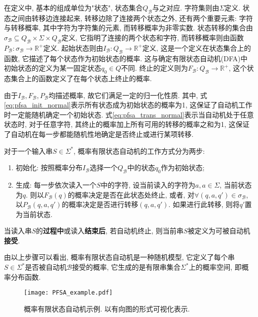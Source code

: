         在定义中, 基本的组成单位为"状态", 状态集合$Q_{\mathcal{B}}$与之对应. 字符集则由$\Sigma$定义. 状态之间由转移边连接起来, 转移边除了连接两个状态之外, 还有两个重要元素: 字符与转移概率, 其中字符为字符集的元素, 而转移概率为非零实数. 状态转移的集合由$\sigma_{\mathcal{B}} \subseteq Q_{\mathcal{B}} \times \Sigma \times Q_{\mathcal{B}}$定义, 它指明了连接的两个状态和字符, 而转移概率则由函数$P_{\mathcal{B}} : \sigma_{\mathcal{B}} \to \mathbb{R}^{+}$定义. 起始状态则由$I_{\mathcal{B}} : Q_{\mathcal{B}} \to \mathbb{R}^{+}$定义, 这是一个定义在状态集合上的函数, 它描述了每个状态作为初始状态的概率. 这与确定有限状态自动机(DFA)中初始状态的定义为某一固定状态$q_0 \in Q$不同. 终止的定义则为$F_{\mathcal{B}}: Q_{\mathcal{B}} \to \mathbb{R}^{+}$, 这个状态集合上的函数定义了在每个状态上终止的概率.
        
        由于$I_\mathcal{B}, F_\mathcal{B}, P_\mathcal{B}$均描述概率, 故它们满足一定的归一化性质. 其中, 式\ref{eq:pfsa_init_normal}表示所有状态成为初始状态的概率为1, 这保证了自动机工作时一定能随机确定一个初始状态. 式\ref{eq:pfsa_trans_normal}表示当自动机处于任意状态时, 对于任意字符, 其终止的概率加上所有可用的转移的概率之和为1, 这保证了自动机在每一步都能随机性地确定是否终止或进行某项转移.
        
        对于一个输入串$S \in \Sigma^{*}$, 概率有限状态自动机的工作方式分为两步:
        \begin{enumerate}
            \item 初始化: 按照概率分布$I_\mathcal{B}$选择一个$Q_{\mathcal{B}}$中的状态$q_0$作为初始状态;
            
            \item 生成: 每一步依次读入一个$S$中的字符, 设当前读入的字符为$a, a \in \Sigma$, 当前状态为$q$. 则以$F_{\mathcal{B}}(q)$的概率决定是否在此状态处终止, 或者, 对$\forall (q, a, q') \in \sigma_{\mathcal{B}}$, 以$P_{\mathcal{B}}(q, a, q')$的概率决定是否进行转移$(q,a,q')$. 如果进行此转移, 则将$q'$置为当前状态.
        \end{enumerate}
        当读入串$S$的\textbf{过程中}或读入\textbf{结束后}, 若自动机终止, 则当前串$S$被定义为可被自动机\textbf{接受}.
        
        由以上步骤可以看出, 概率有限状态自动机是一种随机模型, 它定义了每个串$S \in \Sigma^{*}$是否被自动机$\mathcal{B}$接受的概率, 它生成的是有限串集合$\Sigma^{*}$上的概率空间, 即概率分布函数.
        
        \begin{figure}[!htb]
            \centering
            \texttt{[image: PFSA\_example.pdf]}
            \caption{概率有限状态自动机示例. 以有向图的形式可视化表示.}
            \label{fig:PFSA_example}
        \end{figure}
        
